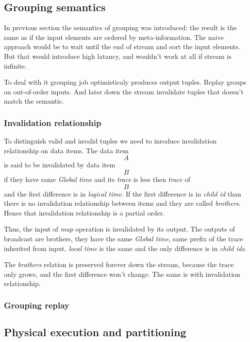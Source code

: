 
\label  {fs-implementation-section}

\subsection{Grouping semantics}
In previous section the semantics of grouping was introduced: the result is the same as if the input elements are ordered by meta-information. The naive approach would be to wait until the end of stream and sort the input elements. But that would introduce high latancy, and wouldn't work at all if stream is infinite. 

To deal with it grouping job optimisticaly produces output tuples. Replay groups on out-of-order inputs. And later down the stream invalidate tuples that doesn't match the semantic.

\subsubsection{Invalidation relationship}
To distinguish valid and invalid tuples we need to inroduce invalidation relationship on data items. The data item \[A\] is said to be invalidated by data item \[B\] if they have same {\it Global time} and its {\it trace} is less then {\it trace} of \[B\] and the first difference is in {\it logical time}. If the first difference is in {\it child id} than there is no invalidation relationship between items and they are called {\it brothers}. Hence that invalidation relationship is a partial order.

Thus, the input of {\it map} operation is invalidated by its output. The outputs of broadcast are brothers, they have the same {\it Global time}, same prefix of the trace inherited from input, {\it local time} is the same and the only difference is in {\it child ids}. 

The {\it brothers} relation is preserved forever down the stream, because the trace only grows, and the first difference won't change. The same is with invalidation relationship.

\subsubsection{Grouping replay}

\subsection{Physical execution and partitioning}

